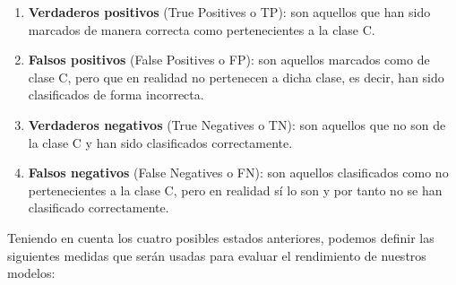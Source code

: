 \documentclass[a4paper,12pt]{report}
\begin{document}
\begin{enumerate}
\item \textbf{Verdaderos positivos} (True Positives o TP): son aquellos que han sido marcados de manera correcta como pertenecientes a la clase C.

\item \textbf{Falsos positivos} (False Positives o FP): son aquellos marcados como de clase C, pero que en realidad no pertenecen a dicha clase, es decir, han sido clasificados de forma incorrecta.

\item \textbf{Verdaderos negativos} (True Negatives o TN): son aquellos que no son de la clase C y han sido clasificados correctamente.

\item \textbf{Falsos negativos} (False Negatives o FN): son aquellos clasificados como no pertenecientes a la clase C, pero en realidad sí lo son y por tanto no se han clasificado correctamente.

\end{enumerate}

\vspace{6mm}
{\setlength{\parindent}{0cm}
Teniendo en cuenta los cuatro posibles estados anteriores, podemos definir las siguientes medidas que serán usadas para evaluar el rendimiento de nuestros modelos:}
\end{document}
